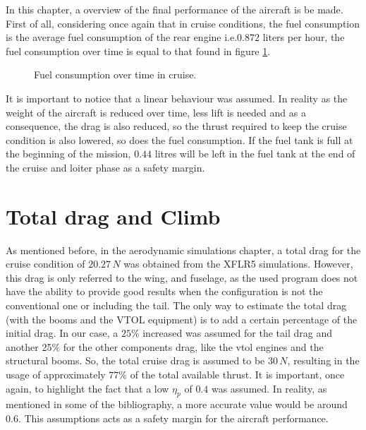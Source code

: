 \documentclass[english,fira]{ist-report}
\begin{document}
In this chapter, a overview of the final performance of the aircraft is be made. First of all, considering once again that in cruise conditions, the fuel consumption is the average fuel consumption of the rear engine i.e.\@ $0.872$ liters per hour, the fuel consumption over time is equal to that found in figure \ref{fig:fuel consumption}.
\begin{figure}[!ht]
    \centering
    \caption{Fuel consumption over time in cruise.}
    \label{fig:fuel consumption}
\end{figure}

It is important to notice that a linear behaviour was assumed. In reality as the weight of the aircraft is reduced over time, less lift is needed and as a consequence, the drag is also reduced, so the thrust required to keep the cruise condition is also lowered, so does the fuel consumption. If the fuel tank is full at the beginning of the mission, $0.44$ litres will be left in the fuel tank at the end of the cruise and loiter phase as a safety margin. 

\section{Total drag and Climb}

As mentioned before, in the aerodynamic simulations chapter, a total drag for the cruise condition of $20.27\,N$ was obtained from the XFLR5 simulations. However, this drag is only referred to the wing, and fuselage, as the used program does not have the ability to provide good results when the configuration is not the conventional one or including the tail. The only way to estimate the total drag (with the booms and the VTOL equipment) is to add a certain percentage of the initial drag. In our case, a $25\%$ increased was assumed for the tail drag and another 25$\%$ for the other components drag, like the vtol engines and the structural booms. So, the total cruise drag is assumed to be $30\,N$, resulting in the usage of approximately $77\%$ of the total available thrust.  It is important, once again, to highlight the fact that a low $\eta_p$ of $0.4$ was assumed. In reality, as mentioned in some of the bibliography, a more accurate value would be around $0.6$. This assumptions acts as a safety margin for the aircraft performance. 
\end{document}
